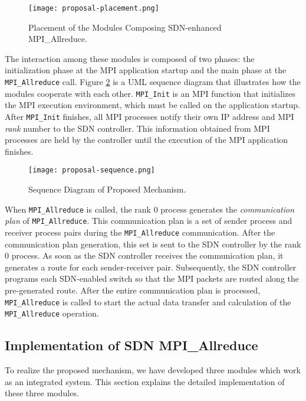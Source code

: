 \begin{figure}[htbp]
    \centering
    \texttt{[image: proposal-placement.png]}
    \caption{Placement of the Modules Composing SDN-enhanced MPI\_Allreduce.}
    \label{fig-proposal-placement}
\end{figure}

The interaction among these modules is composed of two phases: the
initialization phase at the MPI application startup and the main phase
at the \texttt{MPI\_Allreduce} call. Figure \ref{fig-proposal-sequence}
is a UML sequence diagram that illustrates how the modules cooperate
with each other. \texttt{MPI\_Init} is an MPI function that initializes
the MPI execution environment, which must be called on the application
startup. After \texttt{MPI\_Init} finishes, all MPI processes notify
their own IP address and MPI \emph{rank} number to the SDN controller.
This information obtained from MPI processes are held by the controller
until the execution of the MPI application finishes.

\begin{figure}[htbp]
    \centering
    \texttt{[image: proposal-sequence.png]}
    \caption{Sequence Diagram of Proposed Mechanism.}
    \label{fig-proposal-sequence}
\end{figure}

When \texttt{MPI\_Allreduce} is called, the rank 0 process generates the
\emph{communication plan} of \texttt{MPI\_Allreduce}. This communication
plan is a set of sender process and receiver process pairs during the
\texttt{MPI\_Allreduce} communication. After the communication plan
generation, this set is sent to the SDN controller by the rank 0
process. As soon as the SDN controller receives the communication plan,
it generates a route for each sender-receiver pair. Subsequently, the
SDN controller programs each SDN-enabled switch so that the MPI packets
are routed along the pre-generated route. After the entire communication
plan is processed, \texttt{MPI\_Allreduce} is called to start the actual
data transfer and calculation of the \texttt{MPI\_Allreduce} operation.

\hypertarget{implementation-of-sdn-mpi_allreduce}{%
\subsection{Implementation of SDN
MPI\_Allreduce}\label{implementation-of-sdn-mpi_allreduce}}

To realize the proposed mechanism, we have developed three modules which
work as an integrated system. This section explains the detailed
implementation of these three modules.

